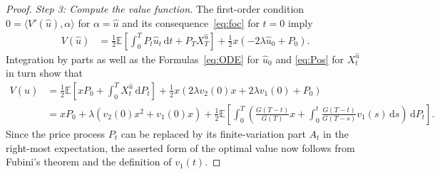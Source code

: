 \documentclass[11pt]{article}
\theoremstyle{definition}
\theoremstyle{remark}
\newcommand{\E}{\mathbb{E}} %
\newcommand{\ts}{\textstyle}
\newcommand{\de}{\,\mathrm{d}}
\begin{document}
\begin{proof}
\emph{Step 3: Compute the value function.}
The first-order condition $0=\langle V'(\hat{u}), \alpha \rangle$ for $\alpha=\hat{u}$ and its consequence~\eqref{eq:foc} for $t=0$ imply
\begin{align*}
V(\hat{u}) &= \frac{1}{2}\E\left[\int_0^T P_t \hat{u}_t \de t + P_T X^{\hat{u}}_T \right] + \frac{1}{2}x(-2\lambda \hat{u}_0 + P_0).
\end{align*}
Integration by parts as well as the Formulas~\eqref{eq:ODE} for $\hat{u}_0$ and \eqref{eq:Pos} for $X^{\hat{u}}_t$ in turn show that
\begin{align*}
V(\hat{u}) &=\frac{1}{2}\E\left[xP_0 + \int_0^T X^{\hat{u}}_t \de P_t \right] + \frac{1}{2}x(2\lambda v_2(0)x + 2\lambda v_1(0) + P_0)\\
&= xP_0 + \lambda(v_2(0)x^2+v_1(0)x) + \frac{1}{2}\E\left[\int_0^T \left(\frac{G(T-t)}{G(T)}x + \int_0^t \frac{G(T-t)}{G(T-s)}v_1(s) \de s\right) \de P_t\right].
\end{align*}
Since the price process $P_t$ can be replaced by its finite-variation part $A_t$ in the right-most expectation, the asserted form of the optimal value now follows from Fubini's theorem and the definition of $v_1(t)$. %

\end{proof}
\end{document}
